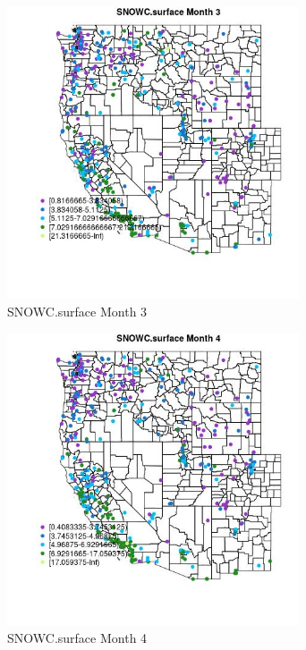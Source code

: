 \begin{figure} 
\centering  
\includegraphics[width=0.77\textwidth]{Code_Outputs/ML_input_report_ML_input_PM25_Step5_part_d_de_duplicated_aves_ML_input_MapObsMo3SNOWCsurface.jpg} 
\caption{\label{fig:ML_input_report_ML_input_PM25_Step5_part_d_de_duplicated_aves_ML_inputMapObsMo3SNOWCsurface}SNOWC.surface Month 3} 
\end{figure} 
 

\begin{figure} 
\centering  
\includegraphics[width=0.77\textwidth]{Code_Outputs/ML_input_report_ML_input_PM25_Step5_part_d_de_duplicated_aves_ML_input_MapObsMo4SNOWCsurface.jpg} 
\caption{\label{fig:ML_input_report_ML_input_PM25_Step5_part_d_de_duplicated_aves_ML_inputMapObsMo4SNOWCsurface}SNOWC.surface Month 4} 
\end{figure} 
 


